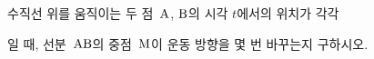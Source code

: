 수직선 위를 움직이는 두 점~$\mathrm{A}$, $\mathrm{B}$의 시각 $t$에서의 위치가 각각 \par\smallskip{}\par\smallskip\noindent 일 때, 선분~$\mathrm{AB}$의 중점~$\mathrm{M}$이 운동 방향을 몇 번 바꾸는지 구하시오.
